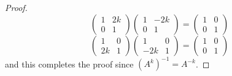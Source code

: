 \begin{proof}
\[\begin{pmatrix}
        1 & 2k \\ 0 & 1 
    \end{pmatrix}\begin{pmatrix}
        1 & -2k \\ 0 & 1
    \end{pmatrix} = \begin{pmatrix}
        1 & 0 \\ 0 & 1
    \end{pmatrix}\]
    \[\begin{pmatrix}
        1 & 0 \\ 2k & 1
    \end{pmatrix}\begin{pmatrix}
        1 & 0 \\ -2k & 1
    \end{pmatrix} = \begin{pmatrix}
        1 & 0 \\ 0 & 1
    \end{pmatrix}\]
    and this completes the proof since $(A^k)^{-1} = A^{-k}$. 
\end{proof}

